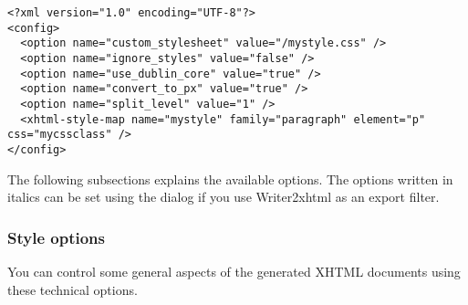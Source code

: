 \documentclass{article}
\begin{document}
\begin{verbatim}
<?xml version="1.0" encoding="UTF-8"?>
<config>
  <option name="custom_stylesheet" value="/mystyle.css" />
  <option name="ignore_styles" value="false" />
  <option name="use_dublin_core" value="true" />
  <option name="convert_to_px" value="true" />
  <option name="split_level" value="1" />
  <xhtml-style-map name="mystyle" family="paragraph" element="p" css="mycssclass" />
</config>
\end{verbatim}
{\mdseries
The following subsections explains the available options. The options written in italics can be set using the dialog if you use Writer2xhtml as an export filter.}

\subsubsection[Style options]{Style options}
{\mdseries
You can control some general aspects of the generated XHTML documents using these technical options.}
\end{document}
